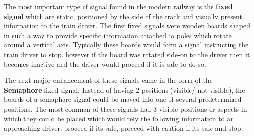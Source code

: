 \begin{comment}
Prior to the days of fixed signals, Policemen would be stationed at
junctions and railway stations. They changed points manually and gave instructions to train drivers
by using a system of either flags or oil lamps depending on the
visibility. Since this was before the time of telecommunications and
electricity there was no way of telling where a train was once it left a
station and went out of sight. The only safety precaution that could be taken
was to use an egg timer to delay the departure of the next train in order to
give the previous train time to progress along the track. Train speeds were
not very high during this period so this was an acceptable way of ensuring safety.
\end{comment}


The most important type of signal found in the modern railway is the \textbf{fixed signal} which are static, positioned by the side of the track and visually present information to the train driver. The first fixed signals were wooden boards shaped in such a way to provide specific information attached to poles which rotate around a vertical axis. Typically these boards would form a signal instructing the train driver to stop, however if the board was rotated side-on to the driver then it becomes inactive and the driver would proceed if it is safe to do so.

\begin{comment}
Modern railway signally makes use of \textbf{fixed signals}. These are permanently positioned
by the side of the track and provide some visual information to the train driver.
The original fixed signal consisted of a shaped wooden board that could be
rotated on pole round a vertical axis. If the board was visible to the driver
then he would have to stop the train. On the other hand if the driver couldn't
see the board because it was side-on to him then he would be able to
proceed.
\end{comment}

The next major enhancement of these signals came in the form of the \textbf{Semaphore} fixed signal.  Instead of having 2 positions (visible/ not visible), the boards of a semaphore signal could be moved into one of several predetermined positions. The most common of these signals had 3 visible positions or aspects in which they could be placed which would rely the following information to an approaching driver: proceed if its safe, proceed with caution if its safe and stop.


